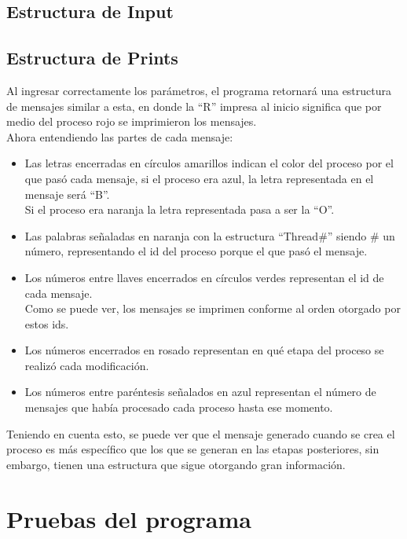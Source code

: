 \documentclass[a4paper]{article}
\begin{document}
    \subsection{Estructura de Input}

    \subsection{Estructura de Prints}
    Al ingresar correctamente los par\'ametros, el programa retornar\'a una estructura de mensajes similar a esta, en donde la ``R'' impresa al inicio significa que por medio del proceso rojo se imprimieron los mensajes.\\

    Ahora entendiendo las partes de cada mensaje:
    \begin{itemize}
        \item[] Las letras encerradas en c\'irculos amarillos indican el color del proceso por el que pas\'o cada mensaje, si el proceso era azul, la letra representada en el mensaje ser\'a ``B''.\\
        Si el proceso era naranja la letra representada pasa a ser la ``O''.
        \item[] Las palabras se\~naladas en naranja con la estructura ``Thread\#'' siendo \# un n\'umero, representando el id del proceso porque el que pas\'o el mensaje.
        \item[] Los n\'umeros entre llaves encerrados en c\'irculos verdes representan el id de cada mensaje.\\
        Como se puede ver, los mensajes se imprimen conforme al orden otorgado por estos ids.
        \item[] Los n\'umeros encerrados en rosado representan en qu\'e etapa del proceso se realiz\'o cada modificaci\'on.
        \item[] Los n\'umeros entre par\'entesis se\~nalados en azul representan el n\'umero de mensajes que hab\'ia procesado cada proceso hasta ese momento.
    \end{itemize}
    Teniendo en cuenta esto, se puede ver que el mensaje generado cuando se crea el proceso es m\'as espec\'ifico que los que se generan en las etapas posteriores, sin embargo, tienen una estructura que sigue otorgando gran informaci\'on.



    \section{Pruebas del programa}
\end{document}
